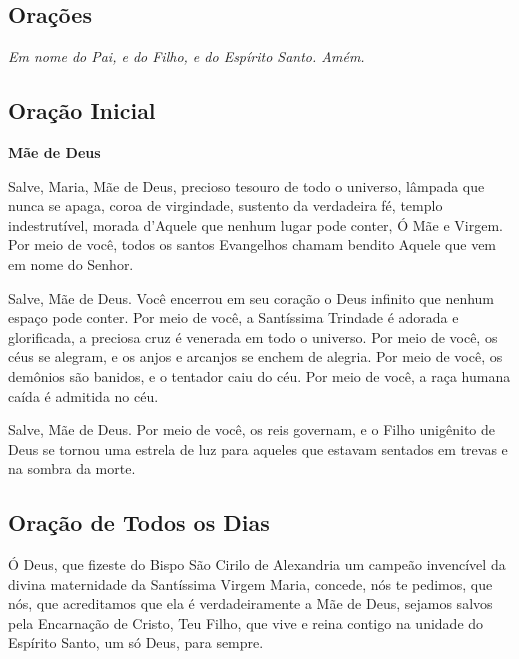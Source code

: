 \documentclass[18pt]{article}
\begin{document}
\begin{justify}

\newpage
\begin{center}
 \section{Orações}\label{sec:Orações} %
\textit{Em nome do Pai, e do Filho, e do Espírito Santo. Amém.}
\end{center}

\subsection{Oração Inicial}

\textbf{Mãe de Deus}

 \settowidth{\versewidth}{Salve, Maria, Mãe de Deus,}
Salve, Maria, Mãe de Deus,  
precioso tesouro de todo o universo,  
lâmpada que nunca se apaga, coroa de virgindade,  
sustento da verdadeira fé, templo indestrutível,  
morada d'Aquele que nenhum lugar pode conter,  
Ó Mãe e Virgem.  
Por meio de você, todos os santos Evangelhos chamam bendito  
Aquele que vem em nome do Senhor.

Salve, Mãe de Deus.  
Você encerrou em seu coração o Deus infinito  
que nenhum espaço pode conter.  
Por meio de você, a Santíssima Trindade é adorada e glorificada,  
a preciosa cruz é venerada em todo o universo.  
Por meio de você, os céus se alegram,  
e os anjos e arcanjos se enchem de alegria.  
Por meio de você, os demônios são banidos,  
e o tentador caiu do céu.  
Por meio de você, a raça humana caída é admitida no céu.

Salve, Mãe de Deus.  
Por meio de você, os reis governam,  
e o Filho unigênito de Deus se tornou uma estrela de luz  
para aqueles que estavam sentados em trevas  
e na sombra da morte.


\subsection{Oração de Todos os Dias}


Ó Deus, que fizeste do Bispo São Cirilo de Alexandria  
um campeão invencível da divina maternidade  
da Santíssima Virgem Maria,  
concede, nós te pedimos, que nós,  
que acreditamos que ela é verdadeiramente a Mãe de Deus,  
sejamos salvos pela Encarnação de Cristo, Teu Filho,  
que vive e reina contigo  
na unidade do Espírito Santo,  
um só Deus, para sempre.


\end{justify}
\end{document}
